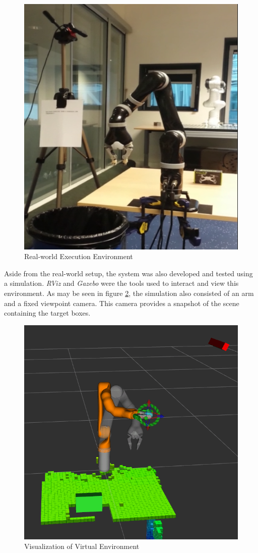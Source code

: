 \documentclass[letterpaper, 10 pt, conference]{conf/ieeeconf}  %
\begin{document}
\begin{figure}[ht]
  \centering
  \includegraphics[width=0.8\linewidth]{real_environment.png}
  \caption{\label{fig:real_environment} Real-world Execution Environment}
\end{figure}

Aside from the real-world setup, the system was also developed and tested using
a simulation. \textit{RViz} and \textit{Gazebo} were the tools used to interact
and view this environment. As may be seen in figure
\ref{fig:virtual_environment}, the simulation also consisted of an arm and a
fixed viewpoint camera. This camera provides a snapshot of the scene containing
the target boxes.

\begin{figure}[ht]
  \centering
  \includegraphics[width=0.8\linewidth]{virtual_environment.png}
  \caption{\label{fig:virtual_environment} Visualization of Virtual Environment}
\end{figure}
\end{document}

